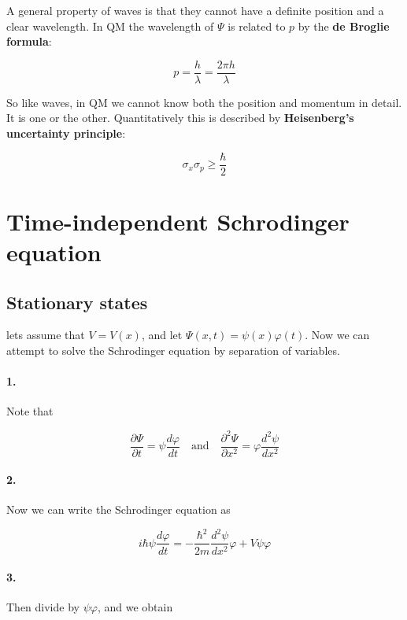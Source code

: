\documentclass[a4paper]{article}
\begin{document}
A general property of waves is that they cannot have a definite position and a clear wavelength. In QM the wavelength of $\Psi$ is related to $p$ by the \textbf{de Broglie formula}:

\begin{equation}
    p=\frac{h}{\lambda}=\frac{2\pi h}{\lambda}
\end{equation}

So like waves, in QM we cannot know both the position and momentum in detail. It is one or the other. Quantitatively this is described by \textbf{Heisenberg's uncertainty principle}:

\begin{equation}
    \sigma_x\sigma_p\ge\frac{\hbar}{2}
\end{equation}

\section{Time-independent Schrodinger equation}

\subsection{Stationary states}

lets assume that $V=V(x)$, and let $\Psi(x,t)=\psi(x)\varphi(t)$. Now we can attempt to solve the Schrodinger equation by separation of variables.

\bigskip

\paragraph{1.} Note that

\begin{equation}
	\frac{\partial\Psi}{\partial t}=\psi\frac{d\varphi}{dt}\quad\text{and}\quad\frac{\partial^2\Psi}{\partial x^2}=\varphi\frac{d^2\psi}{dx^2}
\end{equation}

\paragraph{2.} Now we can write the Schrodinger equation as

\begin{equation}
	i\hbar\psi\frac{d\varphi}{dt}=-\frac{\hbar^2}{2m}\frac{d^2\psi}{dx^2}\varphi+V\psi\varphi
\end{equation}

\paragraph{3.} Then divide by $\psi\varphi$, and we obtain
\end{document}
